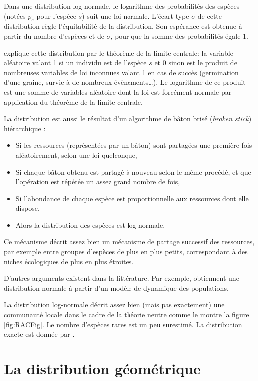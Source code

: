 \documentclass[
  11pt,
  american,
  a4paper,
  extrafontsizes,onecolumn,openright
  ]{memoir}
\providecommand{\tightlist}{%
  \setlength{\itemsep}{0pt}\setlength{\parskip}{0pt}}
\begin{document}
Dans une distribution log-normale, le logarithme des probabilités des espèces (notées \(p_s\) pour l'espèce \(s\)) suit une loi normale.
L'écart-type \(\sigma\) de cette distribution règle l'équitabilité de la distribution.
Son espérance est obtenue à partir du nombre d'espèces et de \(\sigma\), pour que la somme des probabilités égale 1.

\textcite{May1975} explique cette distribution par le théorème de la limite centrale: la variable aléatoire valant 1 si un individu est de l'espèce \(s\) et 0 sinon est le produit de nombreuses variables de loi inconnues valant 1 en cas de succès (germination d'une graine, survie à de nombreux évènements\ldots).
Le logarithme de ce produit est une somme de variables aléatoire dont la loi est forcément normale par application du théorème de la limite centrale.

La distribution est aussi le résultat d'un algorithme de bâton brisé (\emph{broken stick}) hiérarchique \autocite{Bulmer1974}:

\begin{itemize}
\tightlist
\item
  Si les ressources (représentées par un bâton) sont partagées une première fois aléatoirement, selon une loi quelconque,
\item
  Si chaque bâton obtenu est partagé à nouveau selon le même procédé, et que l'opération est répétée un assez grand nombre de fois,
\item
  Si l'abondance de chaque espèce est proportionnelle aux ressources dont elle dispose,
\item
  Alors la distribution des espèces est log-normale.
\end{itemize}

Ce mécanisme décrit assez bien un mécanisme de partage successif des ressources, par exemple entre groupes d'espèces de plus en plus petits, correspondant à des niches écologiques de plus en plus étroites.

D'autres arguments existent dans la littérature.
Par exemple, \textcite{Engen1996} obtiennent une distribution normale à partir d'un modèle de dynamique des populations.

La distribution log-normale décrit assez bien (mais pas exactement) une communauté locale dans le cadre de la théorie neutre \autocite{Hubbell2001} comme le montre la figure \ref{fig:RACFig}.
Le nombre d'espèces rares est un peu surestimé.
La distribution exacte est donnée par \textcite{Volkov2003}.

\hypertarget{la-distribution-guxe9omuxe9trique}{%
\section{La distribution géométrique}\label{la-distribution-guxe9omuxe9trique}}
\end{document}
